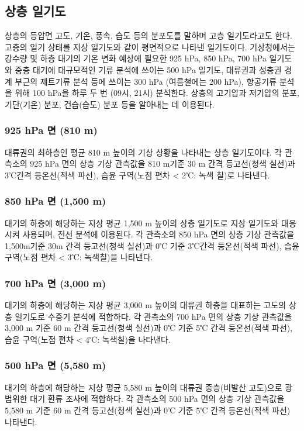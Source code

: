\newpage
\subsection{상층 일기도}

상층의 등압면 고도, 기온, 풍속, 습도 등의 분포도를 말하며 고층 일기도라고도 한다. 고층의 일기 상태를 지상 일기도와 같이 평면적으로 나타낸 일기도이다. 기상청에서는 강수량 및 하층 대기의 기온 변화 예상에 필요한 925 hPa, 850 hPa, 700 hPa 일기도와 중층 대기에 대규모적인 기류 분석에 쓰이는 500 hPa 일기도, 대류권과 성층권 경계 부근의 제트기류 분석 등에 쓰이는 300 hPa (여름철에는 200 hPa), 항공기류 분석을 위해 100 hPa을 하루 두 번 (09시, 21시) 분석한다. 상층의 고기압과 저기압의 분포, 기단(기온) 분포, 건습(습도) 분포 등을 알아내는 데 이용된다.

\subsubsection{925 hPa 면 (810 m)}
대류권의 최하층인 평균 810 m 높이의 기상 상황을 나타내는 상층 일기도이다. 각 관측소의 925 hPa 면의 상층 기상 관측값을 810 m기준 30 m 간격 등고선(청색 실선)과 3℃간격 등온선(적색 파선), 습윤 구역(노점 편차 < 2℃: 녹색 칠)로 나타낸다. 

\subsubsection{850 hPa 면 (1,500 m)}
대기의 하층에 해당하는 지상 평균 1,500 m 높이의 상층 일기도로 지상 일기도와 대응시켜 사용되며, 전선 분석에 이용된다. 각 관측소의 850 hPa 면의 상층 기상 관측값을 1,500m기준 30m 간격 등고선(청색 실선)과 0℃ 기준 3℃간격 등온선(적색 파선), 습윤 구역(노점 편차 < 3℃: 녹색칠)을 나타낸다.

\subsubsection{700 hPa 면 (3,000 m)}
대기의 하층에 해당하는 지상 평균 3,000 m 높이의 대류권 하층을 대표하는 고도의 상층 일기도로 수증기 분석에 적합하다. 각 관측소의 700 hPa 면의 상층 기상 관측값을 3,000 m 기준 60 m 간격 등고선(청색 실선)과 0℃ 기준 5℃ 간격 등온선(적색 파선), 습윤 구역(노점 편차 < 4℃: 녹색칠)을 나타낸다. 

\subsubsection{500 hPa 면 (5,580 m)}
대기의 하층에 해당하는 지상 평균 5,580 m 높이의 대류권 중층(비발산 고도)으로 광범위한 대기 환류 조사에 적합하다. 각 관측소의 500 hPa 면의 상층 기상 관측값을 5,580 m 기준 60 m 간격 등고선(청색 실선)과 0℃ 기준 5℃ 간격 등온선(적색 파선) 나타낸다. 

